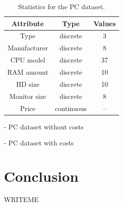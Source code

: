 \documentclass{article}
\renewcommand\[{\begin{equation}}
\renewcommand\]{\end{equation}}
\begin{document}
\begin{table}
    \centering
    \begin{tabular}{ccc}
        {\bf Attribute} & {\bf Type} & {\bf Values} \\
        \hline \hline
        Type & discrete & 3 \\
        Manufacturer & discrete & 8 \\
        CPU model & discrete & 37 \\
        RAM amount & discrete & 10 \\
        HD size & discrete & 10 \\
        Monitor size & discrete & 8 \\
        Price & continuous & --
    \end{tabular}
    \caption{\label{tab:pcdataset} Statistics for the PC dataset.}
\end{table}

- PC dataset without costs

- PC dataset with costs

\section{Conclusion}

WRITEME





\onecolumn
\end{document}
